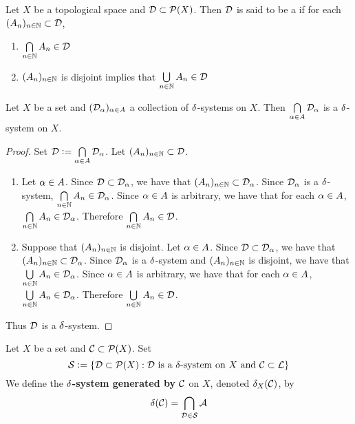 \documentclass{book}
\begin{document}
	\begin{defn} 
		Let $X$ be a topological space and $\mathcal{D} \subset \mathcal{P}(X)$. Then $\mathcal{D}$ is said to be a  if for each $(A_n)_{n \in \mathbb{N}} \subset \mathcal{D}$,
		\begin{enumerate}
			\item $\bigcap\limits_{n \in \mathbb{N}} A_n \in \mathcal{D}$
			\item $(A_n)_{n \in \mathbb{N}}$ is disjoint implies that $\bigcup\limits_{n \in \mathbb{N}} A_n \in \mathcal{D}$
		\end{enumerate}
	\end{defn}
	
	\begin{ex} 
		Let $X$ be a set and $(\mathcal{D}_\alpha)_{\alpha \in A}$ a collection of $\delta$-systems on $X$. Then $\bigcap\limits_{\alpha \in A}\mathcal{D}_{\alpha}$ is a $\delta$-system on $X$.
	\end{ex}
	
	\begin{proof}
		Set $\mathcal{D} \vcentcolon= \bigcap\limits_{\alpha \in A} \mathcal{D}_{\alpha}$. Let $(A_n)_{n \in \mathbb{N}} \subset \mathcal{D}$.
		\begin{enumerate}
			\item Let $\alpha \in A$. Since $\mathcal{D} \subset \mathcal{D}_{\alpha}$, we have that $(A_n)_{n \in \mathbb{N}} \subset \mathcal{D}_{\alpha}$. Since $\mathcal{D}_{\alpha}$ is a $\delta$-system, $\bigcap\limits_{n \in \mathbb{N}} A_n \in \mathcal{D}_{\alpha}$. Since $\alpha \in A$ is arbitrary, we have that for each $\alpha \in A$, $\bigcap\limits_{n \in \mathbb{N}} A_n \in \mathcal{D}_{\alpha}$. Therefore $\bigcap\limits_{n \in \mathbb{N}} A_n \in \mathcal{D}$.   
			\item Suppose that $(A_n)_{n \in \mathbb{N}}$ is disjoint. Let $\alpha \in A$. Since $\mathcal{D} \subset \mathcal{D}_{\alpha}$, we have that $(A_n)_{n \in \mathbb{N}} \subset \mathcal{D}_{\alpha}$. Since $\mathcal{D}_{\alpha}$ is a $\delta$-system and $(A_n)_{n \in \mathbb{N}}$ is disjoint, we have that $\bigcup\limits_{n \in \mathbb{N}} A_n \in \mathcal{D}_{\alpha}$. Since $\alpha \in A$ is arbitrary, we have that for each $\alpha \in A$, $\bigcup\limits_{n \in \mathbb{N}} A_n \in \mathcal{D}_{\alpha}$. Therefore $\bigcup\limits_{n \in \mathbb{N}} A_n \in \mathcal{D}$.   
		\end{enumerate}
		Thus $\mathcal{D}$ is a $\delta$-system.
	\end{proof}
	
	\begin{defn} 
		Let $X$ be a set and $\mathcal{C} \subset \mathcal{P}(X)$. Set 
		$$\mathcal{S} \vcentcolon= \{\mathcal{D} \subset \mathcal{P}(X): \mathcal{D} \text{ is a $\delta$-system on $X$ and $\mathcal{C} \subset \mathcal{L}$} \}$$ 
		We define the \textbf{$\delta$-system generated by $\mathcal{C}$} on $X$, denoted $\delta_X(\mathcal{C})$, by $$\delta(\mathcal{C}) = \bigcap_{\mathcal{D} \in \mathcal{S}} \mathcal{A} $$
	\end{defn}
	
\end{document}
